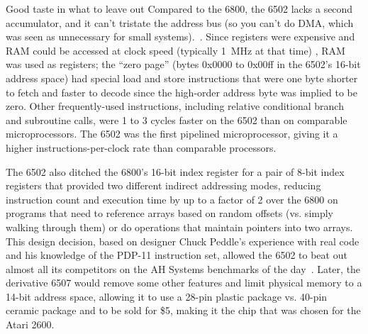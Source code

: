     \begin{geeknote}{Good taste in what to leave out}
Compared to the 6800, the 6502 lacks a second accumulator, and it can't
tristate the address bus (so you can't do DMA, which was seen as
unnecessary for small systems).~\cite{byte75:6502}.
Since registers were expensive and RAM could be accessed at
clock speed (typically
1~MHz at that time) , RAM was used as registers; the ``zero
page'' (bytes 0x0000 to 0x00ff in the 6502's 16-bit address space) had
special load and store instructions that were one byte shorter to fetch and
faster to decode since the high-order address byte was implied to be zero.
Other frequently-used instructions, including relative conditional
branch and subroutine calls, were 1 to 3 cycles faster on the 6502 than
on comparable microprocessors.  The 6502 was the first pipelined
microprocessor, giving it a higher instructions-per-clock 
rate than comparable processors.

The 6502 also ditched the 6800's 16-bit index register for a pair
of 8-bit index registers that provided two different 
indirect addressing modes,
reducing instruction count and execution time by up to a
factor of 2 over the 6800 on 
programs that need to reference arrays based on random
offsets (vs. simply walking through them) or do operations that
maintain pointers into two arrays.
This design decision, based on designer Chuck Peddle's experience with real
code and his knowledge of the PDP-11 instruction set, allowed the 6502
to beat out almost all its competitors on  the AH Systems benchmarks of
the day~\cite{edn75:6502}.  Later, the derivative 6507 would
remove some other features and limit
physical memory to a 14-bit address space, allowing it to use a 28-pin
plastic package vs. 40-pin ceramic package and to be sold for \$5,
making it the chip that was chosen for the Atari 2600.
    \end{geeknote}
